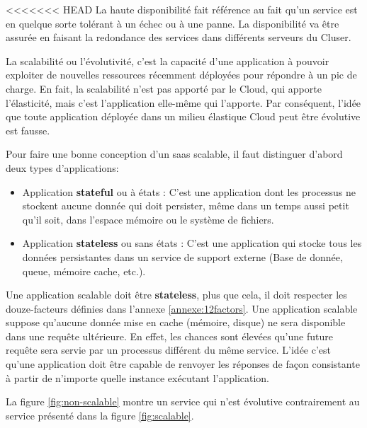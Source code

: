 \begin{onehalfspace}
<<<<<<< HEAD
La haute disponibilité fait référence au fait qu'un service est en quelque sorte tolérant à un échec ou à une panne. La disponibilité va être assurée en faisant la redondance des services dans différents serveurs du Cluser.

La scalabilité ou l'évolutivité, c'est la capacité d'une application à pouvoir exploiter de nouvelles ressources récemment déployées pour répondre à un pic de charge. En fait, la scalabilité n'est pas apporté par le Cloud, qui apporte l'élasticité, mais c'est l'application elle-même qui l'apporte. Par conséquent, l'idée que toute application déployée dans un milieu élastique Cloud peut être évolutive est fausse.


Pour faire une bonne conception d'un \acrshort{saas} scalable, il faut distinguer d'abord deux types d'applications:

\begin{itemize}
	\item Application \textbf{stateful} ou à états : C'est une application dont les processus ne stockent aucune donnée qui doit persister, même dans un temps aussi petit qu'il soit, dans l'espace mémoire ou le système de fichiers.
	\item Application \textbf{stateless} ou sans états : C'est une application qui stocke tous les données persistantes dans un service de support externe (Base de donnée, queue, mémoire cache, etc.).
\end{itemize}

Une application scalable doit être \textbf{stateless}, plus que cela, il doit respecter les douze-facteurs définies dans l'annexe \ref{annexe:12factors}. Une application scalable suppose qu'aucune donnée mise en cache (mémoire, disque) ne sera disponible dans une requête ultérieure. En effet, les chances sont élevées qu'une future requête sera servie par un processus différent du même service. L'idée c'est qu'une application doit être capable de renvoyer les réponses de façon consistante à partir de n'importe quelle instance exécutant l'application.



La figure \ref{fig:non-scalable} montre un service qui n'est évolutive contrairement au service présenté dans la figure \ref{fig:scalable}.



\end{onehalfspace}
